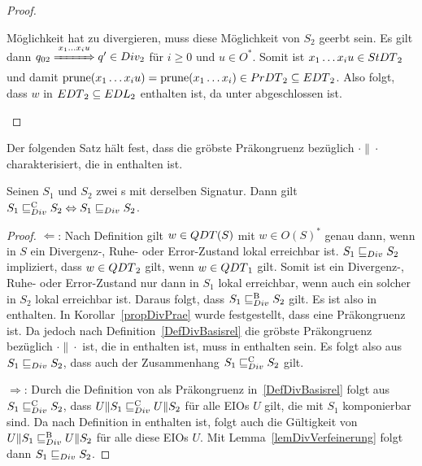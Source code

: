 \begin{proof}
\begin{itemize}
\begin{itemize}
          Möglichkeit hat zu divergieren, muss diese Möglichkeit von $S_2$
          geerbt sein. Es gilt dann $q_{02} \overset{x_1\dots
          x_iu}{\xRightarrow{\hspace{1cm}}} q'\in Div_2$ für $i\geq 0$ und $u\in O^*$. Somit
          ist $x_1\dots x_iu\in StDT{}_2$ und damit $\mathrm{prune}{}(x_1\dots x_iu)=
          \mathrm{prune}{}(x_1\dots x_i)\in PrDT{}_2\subseteq EDT{}_2$. Also folgt,
          dass $w$ in $EDT{}_2 \subseteq EDL{}_2$ enthalten ist, da \DT{}
          unter \cont{} abgeschlossen ist.
      \end{itemize}
  \end{itemize}
\end{proof}

Der folgenden Satz hält fest, dass \DRel{} die gröbste Präkongruenz bezüglich
$\cdot\|\cdot$ charakterisiert, die in \DBRel{} enthalten ist.

\begin{satz}
\label{satzDivFullAbst}
  Seinen $S_1$ und $S_2$ zwei \EIO{}s mit derselben Signatur. Dann gilt $S_1
  \sqsubseteq _{Div}^\mathrm{C}{} S_2\Leftrightarrow S_1\sqsubseteq _{Div}{} S_2$.
\end{satz}

\begin{proof}
  \glqq{}$\Leftarrow$\grqq{}: Nach Definition gilt $w\in QDT{}(S)$ mit $w\in
  O(S)^*$ genau dann, wenn in $S$ ein Divergenz-, Ruhe- oder Error-Zustand
  lokal erreichbar ist. $S_1\sqsubseteq _{Div} S_2$ impliziert, dass
  $w\in QDT{}_2$ gilt, wenn $w\in QDT{}_1$ gilt. Somit ist ein Divergenz-,
  Ruhe- oder Error-Zustand nur dann in $S_1$ lokal erreichbar,
  wenn auch ein solcher in $S_2$ lokal erreichbar ist. Daraus folgt, dass
  $S_1\sqsubseteq _{Div}^\mathrm{B} S_2$ gilt. Es ist also \DRel{} in \DBRel{} enthalten. In
  Korollar~\ref{propDivPrae} wurde festgestellt, dass \DRel{} eine
  Präkongruenz ist. Da jedoch \DCRel{} nach Definition~\ref{DefDivBasisrel} die gröbste Präkongruenz
  bezüglich $\cdot\|\cdot$ ist, die in \DBRel{} enthalten ist, muss \DRel{} in
  \DCRel{} enthalten sein. Es folgt also aus $S_1\sqsubseteq _{Div} S_2$,
  dass auch der Zusammenhang $S_1\sqsubseteq _{Div}^\mathrm{C} S_2$ gilt.

  \glqq{}$\Rightarrow$\grqq{}: Durch die Definition von \DCRel{} als
  Präkongruenz in~\ref{DefDivBasisrel} folgt aus $S_1\sqsubseteq _{Div}^\mathrm{C}{} S_2$, dass
  $U\|S_1\sqsubseteq _{Div}^\mathrm{C} U\|S_2$ für alle EIOs $U$ gilt, die mit $S_1$ komponierbar sind.
  Da \DCRel{} nach Definition in \DBRel{} enthalten ist, folgt auch die
  Gültigkeit von $U\|S_1\sqsubseteq _{Div}^\mathrm{B} U\|S_2$ für alle diese EIOs $U$. Mit
  Lemma~\ref{lemDivVerfeinerung} folgt dann $S_1\sqsubseteq _{Div}{} S_2$.
\end{proof}

